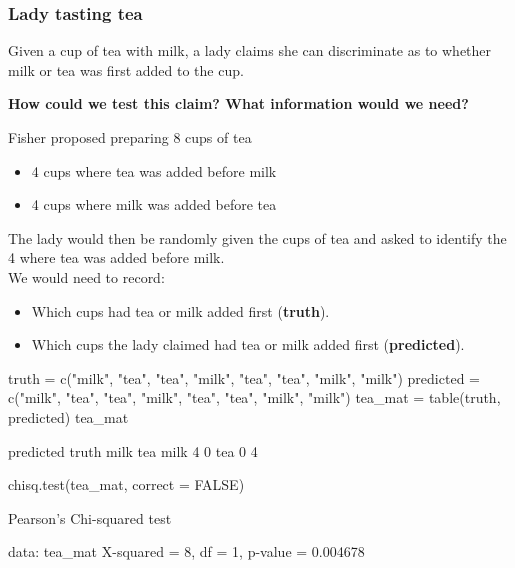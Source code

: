 \documentclass[a4paper]{article}\usepackage[]{graphicx}\usepackage[]{xcolor}
\begin{document}
\subsubsection{Lady tasting tea}
Given a cup of tea with milk, a lady claims she can discriminate as to whether milk or tea was first added to the cup.
\begin{greenbox}
	\textbf{How could we test this claim? What information would we need?}
\end{greenbox}
Fisher proposed preparing 8 cups of tea
\begin{itemize}
	\item 4 cups where tea was added before milk
	\item 4 cups where milk was added before tea
\end{itemize}
The lady would then be randomly given the cups of tea and asked to identify the 4 where tea was added before milk.\\
We would need to record:
\begin{itemize}
	\item Which cups had tea or milk added first (\textbf{truth}).
	\item Which cups the lady claimed had tea or milk added first (\textbf{predicted}).
\end{itemize}
\begin{Schunk}
\begin{Sinput}
truth = c("milk", "tea", "tea", "milk", "tea", "tea", "milk", "milk")
predicted = c("milk", "tea", "tea", "milk", "tea", "tea", "milk", "milk")
tea_mat = table(truth, predicted)
tea_mat
\end{Sinput}
\begin{Soutput}
      predicted
truth  milk tea
  milk    4   0
  tea     0   4
\end{Soutput}
\begin{Sinput}
chisq.test(tea_mat, correct = FALSE)
\end{Sinput}
\begin{Soutput}

	Pearson's Chi-squared test

data:  tea_mat
X-squared = 8, df = 1, p-value = 0.004678
\end{Soutput}
\end{Schunk}
\end{document}
